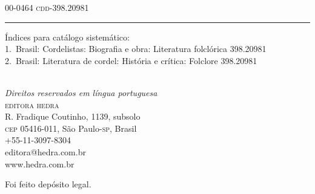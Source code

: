 \begin{center}
\begin{minipage}{.8\textwidth}
\smallskip

00-0464 \hfill \textsc{cdd}-398.20981

\vspace{1ex}\hrule\vspace{1ex}
Índices para catálogo sistemático:\\
1.~Brasil: Cordelistas: Biografia e obra: Literatura folclórica 398.20981\\
2.~Brasil: Literatura de cordel: História e crítica: Folclore 398.20981
\end{minipage}
\vfill

\fontsize{8pt}{\baselineskip}\selectfont
[\the\year]\\
\textit{Direitos reservados em língua portuguesa}\\
\textsc{editora hedra}\\
R. Fradique Coutinho, 1139, subsolo\\
\textsc{cep} 05416-011,  São Paulo-\textsc{sp}, Brasil\\
+55-11-3097-8304\\ 
editora@hedra.com.br\\
www.hedra.com.br\\\smallskip

Foi feito depósito legal.

\end{center}
\endgroup
